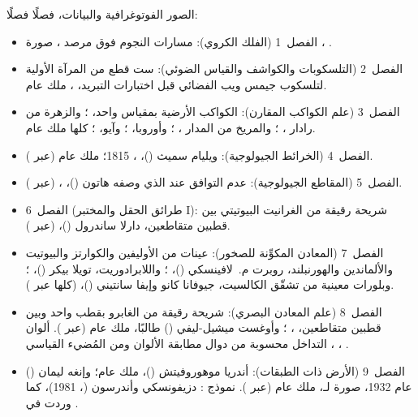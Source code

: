 \bigskip
\noindent الصور الفوتوغرافية والبيانات، فصلًا فصلًا:
\begin{itemize}\small
  \item الفصل~1 (الفلك الكروي): مسارات النجوم فوق مرصد ، صورة ، .
  \item الفصل~2 (التلسكوبات والكواشف والقياس الضوئي): ست قطع من المرآة الأولية لتلسكوب جيمس ويب الفضائي قبل اختبارات التبريد، ، ملك عام.
  \item الفصل~3 (علم الكواكب المقارن): الكواكب الأرضية بمقياس واحد، ؛ والزهرة من رادار ، ؛ والمريخ من المدار ، ؛ وأوروبا، ؛ وآيو، ؛ كلها ملك عام.
  \item الفصل~4 (الخرائط الجيولوجية): ويليام سميث ()، ، 1815؛ ملك عام (عبر ).
  \item الفصل~5 (المقاطع الجيولوجية): عدم التوافق عند  الذي وصفه هاتون ()، ،  (عبر ).
  \item الفصل~6 (طرائق الحقل والمختبر I): شريحة رقيقة من الغرانيت البيوتيتي بين قطبين متقاطعين، دارلا ساندرول ()،  (عبر ).
  \item الفصل~7 (المعادن المكوِّنة للصخور): عينات من الأوليفين والكوارتز والبيوتيت والألماندين والهورنبلند، روبرت م.~لافينسكي ()، ؛ واللابرادوريت، تويلا بيكر ()، ؛ وبلورات معينية من تشقّق الكالسيت، جيوفانا كانو وإيفا سانتيني ()،  (كلها عبر ).
  \item الفصل~8 (علم المعادن البصري): شريحة رقيقة من الغابرو بقطب واحد وبين قطبين متقاطعين، ، ؛ وأوغست ميشيل-ليفي () طالبًا، ملك عام (عبر ). ألوان التداخل محسوبة من دوال مطابقة الألوان  ومن المُضيء القياسي ، ، .
  \item الفصل~9 (الأرض ذات الطبقات): أندريا موهوروفيتش ()، ملك عام؛ وإنغه ليمان () عام 1932، صورة لـ، ملك عام (عبر ). نموذج : دزيفونسكي وأندرسون (، 1981)، كما وردت في .

\end{itemize}
